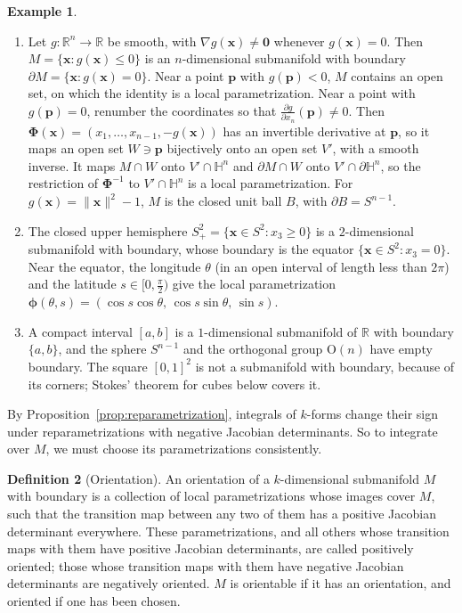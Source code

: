 \documentclass[11pt]{article}
\newcommand{\norm}[1]{\lVert #1 \rVert}
\theoremstyle{definition}
\newtheorem{definition}{Definition}[section]
\newtheorem{example}[definition]{Example}
\theoremstyle{plain}
\theoremstyle{remark}
\begin{document}
\begin{example}\label{ex:manifolds-boundary}
    \begin{enumerate}
        \item Let $g: \mathbb{R}^n \to \mathbb{R}$ be smooth, with $\nabla g(\mathbf{x}) \neq \mathbf{0}$ whenever $g(\mathbf{x}) = 0$. Then $M = \{\mathbf{x} : g(\mathbf{x}) \leq 0\}$ is an $n$-dimensional submanifold with boundary $\partial M = \{\mathbf{x} : g(\mathbf{x}) = 0\}$. Near a point $\mathbf{p}$ with $g(\mathbf{p}) < 0$, $M$ contains an open set, on which the identity is a local parametrization. Near a point with $g(\mathbf{p}) = 0$, renumber the coordinates so that $\frac{\partial g}{\partial x_n}(\mathbf{p}) \neq 0$. Then $\boldsymbol{\Phi}(\mathbf{x}) = (x_1, \ldots, x_{n-1}, -g(\mathbf{x}))$ has an invertible derivative at $\mathbf{p}$, so it maps an open set $W \ni \mathbf{p}$ bijectively onto an open set $V'$, with a smooth inverse. It maps $M \cap W$ onto $V' \cap \mathbb{H}^n$ and $\partial M \cap W$ onto $V' \cap \partial\mathbb{H}^n$, so the restriction of $\boldsymbol{\Phi}^{-1}$ to $V' \cap \mathbb{H}^n$ is a local parametrization. For $g(\mathbf{x}) = \norm{\mathbf{x}}^2 - 1$, $M$ is the closed unit ball $B$, with $\partial B = S^{n-1}$.
        \item The closed upper hemisphere $S^2_+ = \{\mathbf{x} \in S^2 : x_3 \geq 0\}$ is a $2$-dimensional submanifold with boundary, whose boundary is the equator $\{\mathbf{x} \in S^2 : x_3 = 0\}$. Near the equator, the longitude $\theta$ (in an open interval of length less than $2\pi$) and the latitude $s \in [0, \frac{\pi}{2})$ give the local parametrization $\boldsymbol{\phi}(\theta, s) = (\cos s\cos\theta, \, \cos s\sin\theta, \, \sin s)$.
        \item A compact interval $[a, b]$ is a $1$-dimensional submanifold of $\mathbb{R}$ with boundary $\{a, b\}$, and the sphere $S^{n-1}$ and the orthogonal group $\mathrm{O}(n)$ have empty boundary. The square $[0, 1]^2$ is not a submanifold with boundary, because of its corners; Stokes' theorem for cubes below covers it.
    \end{enumerate}
\end{example}

By Proposition~\ref{prop:reparametrization}, integrals of $k$-forms change their sign under reparametrizations with negative Jacobian determinants. So to integrate over $M$, we must choose its parametrizations consistently.

\begin{definition}[Orientation]\label{def:orientation}
    An orientation of a $k$-dimensional submanifold $M$ with boundary is a collection of local parametrizations whose images cover $M$, such that the transition map between any two of them has a positive Jacobian determinant everywhere. These parametrizations, and all others whose transition maps with them have positive Jacobian determinants, are called positively oriented; those whose transition maps with them have negative Jacobian determinants are negatively oriented. $M$ is orientable if it has an orientation, and oriented if one has been chosen.
\end{definition}
\end{document}
